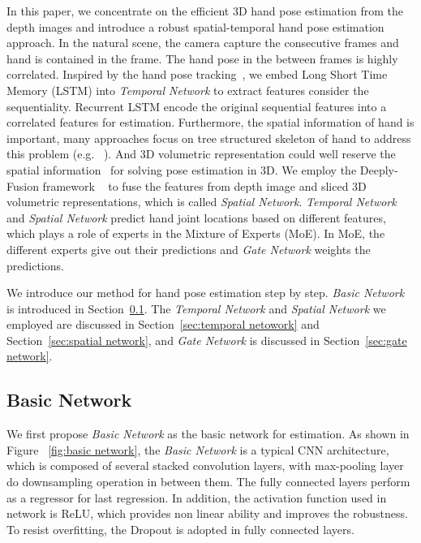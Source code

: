 \documentclass[journal,comsoc]{IEEEtran}
\begin{document}
In this paper, we concentrate on the efficient 3D hand pose estimation from the depth images and
introduce a robust spatial-temporal hand pose estimation approach. In the natural scene, the camera
capture the consecutive frames and hand is contained in the frame.
The hand pose in the between frames is highly correlated. Inspired by the hand pose
tracking~\cite{quach2016depth}, we embed Long Short Time Memory (LSTM) into \emph{Temporal Network}
to extract features consider the sequentiality. Recurrent LSTM encode the original sequential
features into a correlated features for estimation. Furthermore, the spatial information of hand is
important, many approaches focus on tree structured skeleton of hand to address this problem (e.g.
~\cite{li20153d, wan2016direction, ye2016spatial}). And 3D volumetric representation could well reserve
the spatial information~\cite{deng2017hand3d} for solving pose estimation in 3D. We employ the
Deeply-Fusion framework ~\cite{wang2016deeply} to fuse the features from depth image and sliced 3D
volumetric representations, which is called \emph{Spatial Network}. \emph{Temporal Network} and
\emph{Spatial Network} predict hand joint locations based on different features, which plays a
role of experts in the Mixture of Experts (MoE). In MoE, the different experts give out their
predictions and \emph{Gate Network} weights the predictions.

We introduce our method for hand pose estimation step by step. \emph{Basic Network} is introduced
in Section~\ref{sec:basic network}. The \emph{Temporal Network} and \emph{Spatial Network} we
employed are discussed in Section~\ref{sec:temporal netowork} and Section~\ref{sec:spatial network}, and \emph{Gate Network} is
discussed in Section~\ref{sec:gate network}.



\subsection{Basic Network}\label{sec:basic network}
We first propose \emph{Basic Network} as the basic network for estimation. As shown in Figure
~\ref{fig:basic network}, the \emph{Basic Network} is a typical CNN architecture, which is composed
of several stacked convolution layers, with max-pooling layer do downsampling operation in between
them. The fully connected layers perform as a regressor for last regression. In addition, the activation
function used in network is ReLU, which provides non linear ability and improves the robustness. To resist
overfitting, the Dropout is adopted in fully connected layers.
\end{document}
